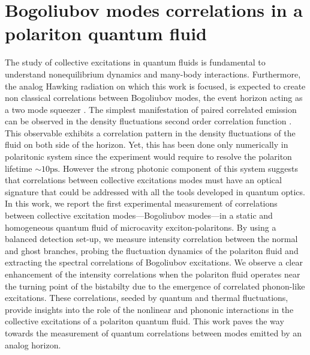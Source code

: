 

\newcommand{\hf}{\hat{f}}
\newcommand{\hX}{\hat{X}}
\newcommand{\hY}{\hat{Y}}

\graphicspath{{./}{./fig/}{./chap_correlation/fig/}}

\chapter{Bogoliubov modes correlations in a polariton quantum fluid}

\label{chap:correlation}

The study of collective excitations in quantum fluids is fundamental to understand nonequilibrium dynamics and many-body interactions. Furthermore, the analog Hawking radiation
on which this work is focused, is expected to create non classical correlations between Bogoliubov modes, the event horizon acting as a two mode squeezer \cite{agullo_symplectic_2022}. The simplest manifestation
of paired correlated emission can be observed in the density fluctuations second order correlation function \cite{nguyen_acoustic_2015, carusotto_stimulatedfluid_2016,jacquet_quantum_2023,steinhauer_observation_2016}.
This observable exhibits a correlation pattern in the density fluctuations of the fluid on both side of the horizon.
Yet, this has been done only numerically in polaritonic system since the experiment would require to resolve the polariton lifetime $\sim 10 \mathrm{ps}$. However 
the strong photonic component of this system suggests that correlations between collective excitations modes must have an optical signature that could be addressed
with all the tools developed in quantum optics.
In this work, we report the first experimental measurement of correlations between collective excitation modes—Bogoliubov modes—in a static and homogeneous quantum fluid of microcavity exciton-polaritons.
 By using a balanced detection set-up, we measure intensity correlation between the normal and ghost branches, probing the fluctuation dynamics of the polariton fluid and extracting the spectral correlations of Bogoliubov excitations.
  We observe a clear enhancement of the intensity correlations when the polariton fluid operates near the turning point of the bistabilty due to the emergence of correlated phonon-like excitations. These correlations, seeded by quantum and thermal fluctuations, provide insights into the role of the nonlinear and phononic interactions in the collective excitations of a polariton quantum fluid.
This work paves the way towards the measurement of quantum correlations between modes emitted by an analog horizon.

